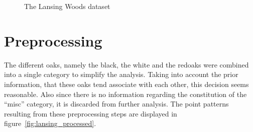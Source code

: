 \documentclass[12pt,a4paper,oneside,article]{memoir}
\begin{document}
\begin{figure}[htb]
\begin{adjustwidth}{-2in}{-2in}
  \end{adjustwidth}
  \caption{The Lansing Woods dataset}
  \label{fig:lansing_separate}
\end{figure}

 \section{Preprocessing}

The different oaks, namely the black, the white and the redoaks were combined into
a single category to simplify the analysis.
Taking into account the prior information, that these oaks tend associate
with each other, this decision seems reasonable. Also since there is no 
information regarding the constitution of the ``misc'' category, it is discarded 
from further analysis. The point patterns resulting from these preprocessing steps 
are displayed in figure~\ref{fig:lansing_processed}.
\end{document}
